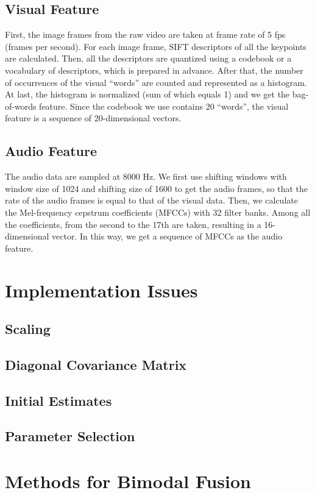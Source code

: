 \documentclass[12pt,final,twoside]{report}
\theoremstyle{plain}
\theoremstyle{definition}
\theoremstyle{remark}
\begin{document}
\subsection{Visual Feature}
First, the image frames from the raw video are taken at frame rate of 5 fps (frames per second). For each image frame, SIFT descriptors of all the keypoints are calculated. Then, all the descriptors are quantized using a codebook or a vocabulary of descriptors, which is prepared in advance. After that, the number of occurrences of the visual ``words'' are counted and represented as a histogram. At last, the histogram is normalized (sum of which equals 1) and we get the bag-of-words feature. Since the codebook we use contains 20 ``words'', the visual feature is a sequence of 20-dimensional vectors.

\subsection{Audio Feature}
The audio data are sampled at 8000 Hz. We first use shifting windows with window size of 1024 and shifting size of 1600 to get the audio frames, so that the rate of the audio frames is equal to that of the visual data. Then, we calculate the Mel-frequency cepstrum coefficients (MFCCs) with 32 filter banks. Among all the coefficients, from the second to the 17th are taken, resulting in a 16-dimensional vector. In this way, we get a sequence of MFCCs as the audio feature.


\section{Implementation Issues}
\subsection{Scaling}
\subsection{Diagonal Covariance Matrix}
\subsection{Initial Estimates}
\subsection{Parameter Selection}

\section{Methods for Bimodal Fusion}
\end{document}
